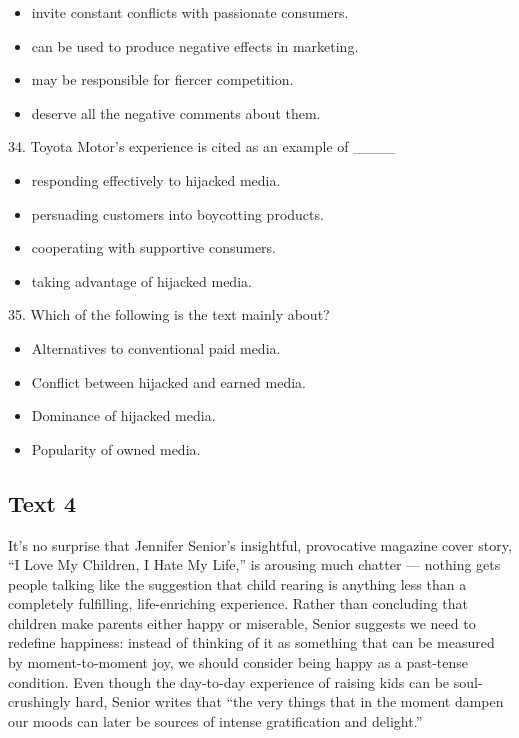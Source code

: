 \documentclass[UTF8,11pt]{ctexart}
\begin{document}
\begin{itemize}[leftmargin=2em,itemsep=.2em,topsep=.4em]\item[A.] invite constant conflicts with passionate consumers.
\item[B.] can be used to produce negative effects in marketing.
\item[C.] may be responsible for fiercer competition.
\item[D.] deserve all the negative comments about them.
\end{itemize}

34. Toyota Motor's experience is cited as an example of \_\_\_\_


\begin{itemize}[leftmargin=2em,itemsep=.2em,topsep=.4em]\item[A.] responding effectively to hijacked media.
\item[B.] persuading customers into boycotting products.
\item[C.] cooperating with supportive consumers.
\item[D.] taking advantage of hijacked media.
\end{itemize}

35. Which of the following is the text mainly about?


\begin{itemize}[leftmargin=2em,itemsep=.2em,topsep=.4em]\item[A.] Alternatives to conventional paid media.
\item[B.] Conflict between hijacked and earned media.
\item[C.] Dominance of hijacked media.
\item[D.] Popularity of owned media.
\end{itemize}

\subsection*{\textbf{Text 4}}


It's no surprise that Jennifer Senior's insightful, provocative magazine cover story, “I Love My Children, I Hate My Life,” is arousing much chatter — nothing gets people talking like the suggestion that child rearing is anything less than a completely fulfilling, life-enriching experience. Rather than concluding that children make parents either happy or miserable, Senior suggests we need to redefine happiness: instead of thinking of it as something that can be measured by moment-to-moment joy, we should consider being happy as a past-tense condition. Even though the day-to-day experience of raising kids can be soul-crushingly hard, Senior writes that “the very things that in the moment dampen our moods can later be sources of intense gratification and delight.”
\end{document}
